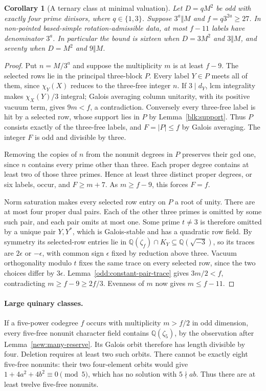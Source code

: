 \documentclass[11pt]{amsart}
\numberwithin{equation}{section}
\newtheorem{corollary}[theorem]{Corollary}
\theoremstyle{definition}
\theoremstyle{plain}
\newcommand{\QQ}{\mathbb Q}
\begin{document}
\begin{corollary}[A ternary class at minimal valuation]\label{odd:minimal-ternary}
Let $D=qM^2$ be odd with exactly four prime divisors, where
$q\in\{1,3\}$. Suppose $3^a\Vert M$ and $f=q3^{2a}\ge27$.
In non-pointed based-simple rotation-admissible data, at most $f-11$
labels have denominator $3^a$. In particular the bound is sixteen
when $D=3M^2$ and $3\Vert M$, and seventy when $D=M^2$ and $9\Vert M$.
\end{corollary}
\begin{proof}
Put $n=M/3^a$ and suppose the multiplicity $m$ is at least $f-9$.
The selected rows lie in the principal three-block $P$. Every label
$Y\in P$ meets all of them, since $\chi_Y(X)$ reduces to the three-free
integer $n$. If $3\mid d_Y$, lcm integrality makes
$\chi_X(Y)/3$ integral; Galois averaging column unitarity, with its
positive vacuum term, gives $9m<f$, a contradiction. Conversely every
three-free label is hit by a selected row, whose
support lies in $P$ by Lemma~\ref{blk:support}. Thus $P$ consists
exactly of the three-free labels, and $F=|P|\le f$ by
Galois averaging. The integer $F$ is odd and divisible by three.

Removing the copies of $n$ from the nonunit degrees in $P$ preserves
their gcd one, since $n$ contains every prime other than three.
Each proper degree contains at least two of those three primes.
Hence at least three distinct proper degrees, or six labels, occur,
and $F\ge m+7$. As $m\ge f-9$, this forces $F=f$.

Norm saturation makes every selected row entry on $P$ a root of unity.
There are at most four proper dual pairs. Each of the other three
primes is omitted by some such pair, and each pair omits at most one.
Some prime $t\ne3$ is therefore omitted by a unique pair $Y,Y^*$,
which is Galois-stable and has a quadratic row field. By symmetry its
selected-row entries lie in
$\mathbb Q(\zeta_f)\cap K_Y\subseteq\mathbb Q(\sqrt{-3})$, so its traces
are $2\epsilon$ or $-\epsilon$, with common sign $\epsilon$
fixed by reduction above three. Vacuum orthogonality modulo $t$
fixes the same trace on every selected row, since the two choices
differ by $3\epsilon$. Lemma~\ref{odd:constant-pair-trace} gives
$3m/2<f$, contradicting $m\ge f-9\ge2f/3$.
Evenness of $m$ now gives $m\le f-11$.
\end{proof}

\paragraph{Large quinary classes.}
If a five-power codegree $f$ occurs with multiplicity $m>f/2$
in odd dimension, every five-free nonunit character field contains
$\QQ(\zeta_5)$, by the observation after
Lemma~\ref{new:many-reserve}. Its Galois orbit therefore has length
divisible by four. Deletion requires at least two such orbits.
There cannot be exactly eight five-free nonunits: their two
four-element orbits would give $1+4a^2+4b^2\equiv0\pmod5$,
which has no solution with $5\nmid ab$. Thus there are at least
twelve five-free nonunits.
\end{document}
